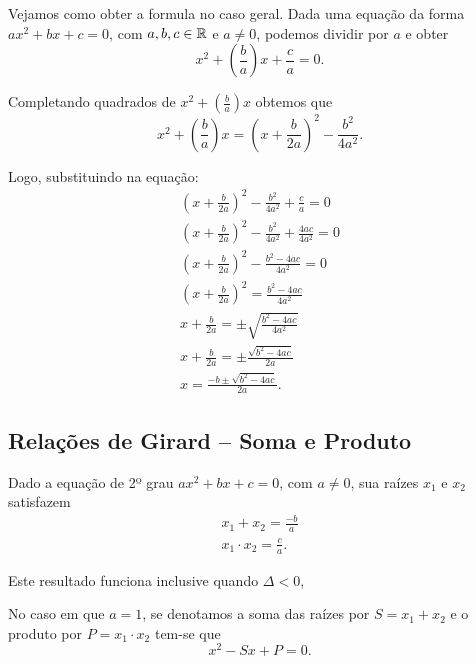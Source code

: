 Vejamos como obter a formula no caso geral. Dada uma equação da forma $ax^2+bx+c=0$, com $a,b,c\in\mathbb{R}$ e $a\neq 0$, podemos dividir por $a$ e obter
\begin{equation*}
    x^2+\left(\frac{b}{a}\right) x +\frac{c}{a}=0.
\end{equation*}

Completando quadrados de $x^2+\left(\frac{b}{a}\right) x$ obtemos que
\begin{equation*}
    x^2+\left(\frac{b}{a}\right) x  = \left(x+\frac{b}{2a}\right)^2 - \frac{b^2}{4a^2}.
\end{equation*}

Logo, substituindo na equação:
\begin{gather*}
    \left(x+\frac{b}{2a}\right)^2 - \frac{b^2}{4a^2} +\frac{c}{a} = 0\\
    \left(x+\frac{b}{2a}\right)^2 - \frac{b^2}{4a^2} +\frac{4ac}{4a^2} = 0\\
    \left(x+\frac{b}{2a}\right)^2 - \frac{b^2-4ac}{4a^2}= 0\\
    \left(x+\frac{b}{2a}\right)^2 = \frac{b^2-4ac}{4a^2}\\
    x+\frac{b}{2a} = \pm\sqrt{\frac{b^2-4ac}{4a^2}}\\
    x+\frac{b}{2a} = \pm\frac{\sqrt{b^2-4ac}}{2a}\\
    x= \frac{-b \pm \sqrt{b^2-4ac}}{2a}.
\end{gather*}

\subsection{Relações de Girard -- Soma e Produto}

\begin{obs}
Dado a equação de 2º grau $ax^2+bx+c=0$, com $a\neq 0$, sua raízes 
$x_1$ e $x_2$ satisfazem
\begin{gather*}
    x_1+x_2=\frac{-b}{a}\\
    x_1\cdot x_2 = \frac{c}{a}.
\end{gather*}
\end{obs}

Este resultado funciona inclusive quando $\Delta<0$,

No caso em que $a=1$, se denotamos a soma das raízes por $S=x_1+x_2$ e o produto por $P=x_1\cdot x_2$ tem-se que
\begin{equation*}
    x^2-Sx+P=0.
\end{equation*}

